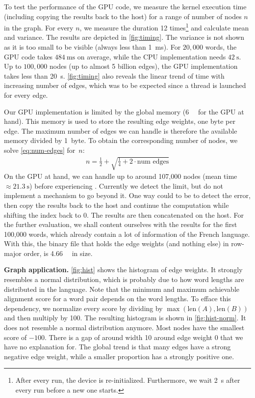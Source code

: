 \vspace{-1.7em}

To test the performance of the GPU code, we measure the kernel execution time (including copying the results back to the host) for a range of number of nodes $n$ in the graph. For every $n$, we measure the duration 12 times\footnote{After every run, the device is re-initialized. Furthermore, we wait \qty{2}{\s} after every run before a new one starts.} and calculate mean and variance. The results are depicted in \autoref{fig:timing}. The variance is not shown as it is too small to be visible (always less than \qty{1}{\ms}). For $20,000$ words, the GPU code takes $\qty{484}{\ms}$ on average, while the CPU implementation needs $\qty{42}{\s}$. Up to $100,000$ nodes (\ie up to almost 5 billion edges), the GPU implementation takes less than \qty{20}{\s}. \autoref{fig:timing} also reveals the linear trend of time with increasing number of edges, which was to be expected since a thread is launched for every edge.

Our GPU implementation is limited by the global memory (\qty{6}{\giga\byte} for the GPU at hand). This memory is used to store the resulting edge weights, \ie one byte per edge. The maximum number of edges we can handle is therefore the available memory divided by 1~byte. To obtain the corresponding number of nodes, we solve \eqref{eq:num-edges} for~$n$:
\begin{align}
    n = \frac{1}{2} + \sqrt{\frac{1}{4} + 2 \cdot \text{num edges}}
\end{align}
On the GPU at hand, we can handle up to around 107,000 nodes (mean time $\approx \qty{21.3}{\s}$) before experiencing . Currently we detect the limit, but do not implement a mechanism to go beyond it. One way could to be to detect the error, then copy the results back to the host and continue the computation while shifting the index back to $0$. The results are then concatenated on the host. For the further evaluation, we shall content ourselves with the results for the first 100,000 words, which already contain a lot of information of the French language. With this, the binary file that holds the edge weights (and nothing else) in row-major order, is \qty{4.66}{\giga\byte} in size.

\textbf{Graph application.} \autoref{fig:hist} shows the histogram of edge weights. It strongly resembles a normal distribution, which is probably due to how word lengths are distributed in the language. Note that the minimum and maximum achievable alignment score for a word pair depends on the word lengths. To efface this dependency, we normalize every score by dividing by $\max(\text{len}(A), \text{len}(B))$ and then multiply by 100. The resulting histogram is shown in \autoref{fig:hist-norm}. It does not resemble a normal distribution anymore. Most nodes have the smallest score of $-100$. There is a gap of around width 10 around edge weight 0 that we have no explanation for. The global trend is that many edges have a strong negative edge weight, while a smaller proportion has a strongly positive one.\label{paragraph:normalization}

